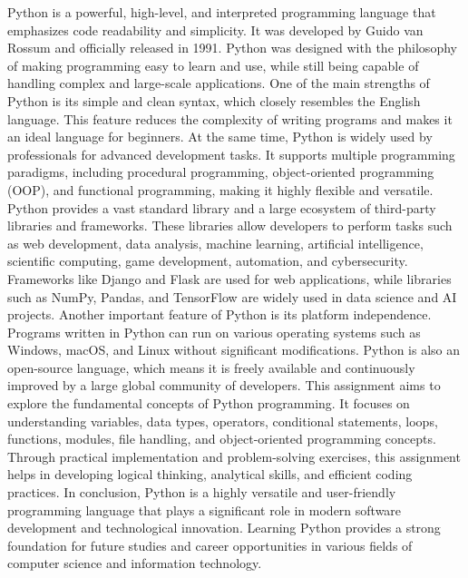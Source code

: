 {
Python is a powerful, high-level, and interpreted programming language that emphasizes code readability and simplicity. It was developed by Guido van Rossum and officially released in 1991. Python was designed with the philosophy of making programming easy to learn and use, while still being capable of handling complex and large-scale applications.
One of the main strengths of Python is its simple and clean syntax, which closely resembles the English language. This feature reduces the complexity of writing programs and makes it an ideal language for beginners. At the same time, Python is widely used by professionals for advanced development tasks. It supports multiple programming paradigms, including procedural programming, object-oriented programming (OOP), and functional programming, making it highly flexible and versatile.
Python provides a vast standard library and a large ecosystem of third-party libraries and frameworks. These libraries allow developers to perform tasks such as web development, data analysis, machine learning, artificial intelligence, scientific computing, game development, automation, and cybersecurity. Frameworks like Django and Flask are used for web applications, while libraries such as NumPy, Pandas, and TensorFlow are widely used in data science and AI projects.
Another important feature of Python is its platform independence. Programs written in Python can run on various operating systems such as Windows, macOS, and Linux without significant modifications. Python is also an open-source language, which means it is freely available and continuously improved by a large global community of developers.
This assignment aims to explore the fundamental concepts of Python programming. It focuses on understanding variables, data types, operators, conditional statements, loops, functions, modules, file handling, and object-oriented programming concepts. Through practical implementation and problem-solving exercises, this assignment helps in developing logical thinking, analytical skills, and efficient coding practices.
In conclusion, Python is a highly versatile and user-friendly programming language that plays a significant role in modern software development and technological innovation. Learning Python provides a strong foundation for future studies and career opportunities in various fields of computer science and information technology.
}